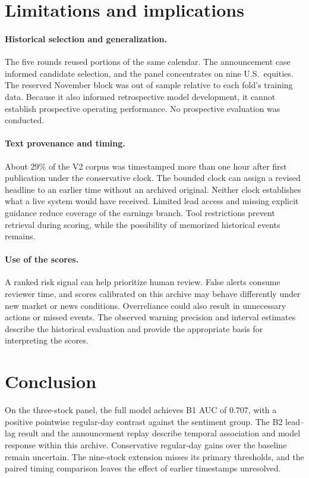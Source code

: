 \documentclass{article}
\begin{document}
\section{Limitations and implications}
\label{sec:limitations}

\paragraph{Historical selection and generalization.}
The five rounds reused portions of the same calendar. The announcement case informed candidate selection, and the panel concentrates on nine U.S.\ equities. The reserved November block was out of sample relative to each fold's training data. Because it also informed retrospective model development, it cannot establish prospective operating performance. No prospective evaluation was conducted.

\paragraph{Text provenance and timing.}
About 29\% of the V2 corpus was timestamped more than one hour after first publication under the conservative clock. The bounded clock can assign a revised headline to an earlier time without an archived original. Neither clock establishes what a live system would have received. Limited lead access and missing explicit guidance reduce coverage of the earnings branch. Tool restrictions prevent retrieval during scoring, while the possibility of memorized historical events remains.

\paragraph{Use of the scores.}
A ranked risk signal can help prioritize human review. False alerts consume reviewer time, and scores calibrated on this archive may behave differently under new market or news conditions. Overreliance could also result in unnecessary actions or missed events. The observed warning precision and interval estimates describe the historical evaluation and provide the appropriate basis for interpreting the scores.

\section{Conclusion}

On the three-stock panel, the full model achieves B1 AUC of 0.707, with a positive pointwise regular-day contrast against the sentiment group. The B2 lead--lag result and the announcement replay describe temporal association and model response within this archive. Conservative regular-day gains over the baseline remain uncertain. The nine-stock extension misses its primary thresholds, and the paired timing comparison leaves the effect of earlier timestamps unresolved.
\end{document}
